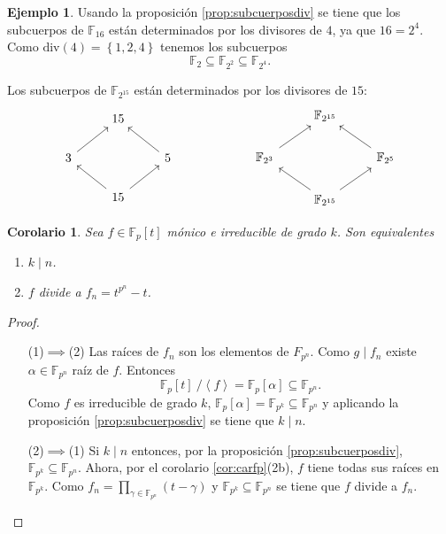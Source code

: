 \documentclass[10pt, spanish]{report}
\newtheorem{cor}{Corolario}[tma]
\theoremstyle{definition}
\newtheorem*{ej}{Ejemplo}
\newcommand{\F}{\mathbb{F}}
\newcommand{\fecha}[1]{\marginpar{\underline{\footnotesize{#1}}}}
\begin{document}
\fecha{23/03}
\begin{ej}
    Usando la proposición \ref{prop:subcuerposdiv} se tiene que los subcuerpos
    de $\F_{16}$ están determinados por los divisores de $4$, ya que $16=2^4$.
    Como $\text{div}(4)=\left\{ 1,2,4 \right\}$ tenemos los subcuerpos
    \[\F_2\subseteq\F_{2^2}\subseteq\F_{2^4}.\]

    Los subcuerpos de $\F_{2^{15}}$ están determinados por los divisores de
    $15$:\[\begin{tikzcd}
              & 15               & \\
        3 \ar[ur] &                  & 5 \ar[ul] \\
                  & 15\ar[ul]\ar[ur] &
    \end{tikzcd}\hspace{6em}
    \begin{tikzcd}
              & \F_{2^{15}}              & \\
        \F_{2^3} \ar[ur] &                  & \F_{2^5} \ar[ul] \\
                         & \F_{2^{15}}\ar[ul]\ar[ur] &
    \end{tikzcd}\]
\end{ej}

\begin{cor}
    Sea $f\in\F_p[t]$ mónico e irreducible de grado $k$. Son equivalentes
    \begin{enumerate}
        \item $k\mid n$.
        \item $f$ divide a $f_n = t^{p^n}-t$.
    \end{enumerate}
\end{cor}

\begin{proof}
    \hspace{0pt}
    \begin{itemize}[itemindent=36pt]
        \item[(1)$\implies$(2)] Las raíces de $f_n$ son los elementos de
            $F_{p^n}$. Como $g\mid f_n$ existe $\alpha\in\F_{p^n}$ raíz de $f$.
            Entonces \[\F_p[t]\ /\left<f\right>=\F_p[\alpha]\subseteq\F_{p^n}.\]
            Como $f$ es irreducible de grado $k$,
            $\F_p[\alpha]=\F_{p^k}\subseteq \F_{p^n}$ y aplicando la
            proposición \ref{prop:subcuerposdiv} se tiene que $k\mid n$.
        \item[(2)$\implies$(1)] Si $k\mid n$ entonces, por la
            proposición \ref{prop:subcuerposdiv}, $\F_{p^k}\subseteq\F_{p^n}$.
            Ahora, por el corolario \ref{cor:carfp}(2b), $f$ tiene todas sus
            raíces en $\F_{p^k}$. Como $f_n=\prod_{\gamma\in\F_{p^n}}(t-\gamma)$
            y $\F_{p^k}\subseteq\F_{p^n}$ se tiene  que $f$ divide a $f_n$.
    \end{itemize}
\end{proof}
\end{document}
